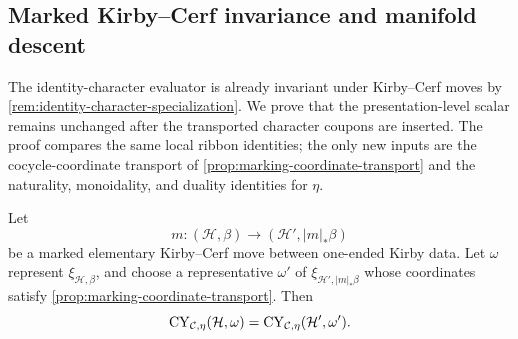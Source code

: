 \subsection{Marked Kirby--Cerf invariance and manifold descent}
\label{subsec:kirby-invariance}

The identity-character evaluator is already invariant under Kirby--Cerf
moves by \cref{rem:identity-character-specialization}.  We prove that the
presentation-level scalar remains unchanged after the transported character
coupons are inserted.  The proof compares the same local ribbon identities;
the only new inputs are the cocycle-coordinate transport of
\cref{prop:marking-coordinate-transport} and the naturality, monoidality, and
duality identities for \(\eta\).


\begin{lemma}
\label{lem:character-compatibility-elementary-moves}
Let
\[
  m\colon(\mathcal H,\beta)
  \longrightarrow(\mathcal H',|m|_*\beta)
\]
be a marked elementary Kirby--Cerf move between one-ended Kirby data.  Let
\(\omega\) represent \(\xi_{\mathcal H,\beta}\), and choose a representative
\(\omega'\) of \(\xi_{\mathcal H',|m|_*\beta}\) whose coordinates satisfy
\cref{prop:marking-coordinate-transport}.  Then
\[
  \operatorname{CY}_{\mathcal{C},\eta}(\mathcal H,\omega)
  =
  \operatorname{CY}_{\mathcal{C},\eta}(\mathcal H',\omega').
\]
\end{lemma}

